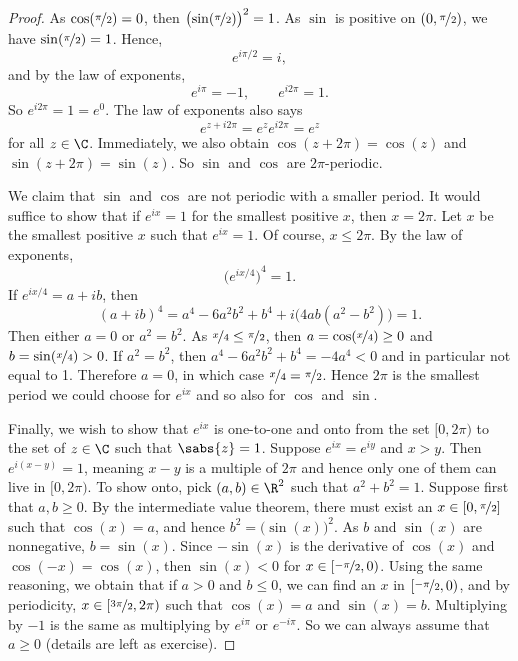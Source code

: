 \begin{proof}
As $\cos(\nicefrac{\pi}{2}) = 0$, then
${\bigl(\sin(\nicefrac{\pi}{2})\bigr)}^2 = 1$.
As $\sin$ is positive on $(0,\nicefrac{\pi}{2})$, we have
$\sin(\nicefrac{\pi}{2}) = 1$.
Hence,
\begin{equation*}
e^{i \pi /2} = i ,
\end{equation*}
and by the law of exponents,
\begin{equation*}
e^{i \pi} = -1 ,
\qquad 
e^{i 2\pi} = 1 .
\end{equation*}
So $e^{i2\pi} = 1 = e^0$.  The law of exponents also says
\begin{equation*}
e^{z+i2\pi} = e^z e^{i2\pi} = e^z
\end{equation*}
for all $z \in \C$.  Immediately, we also obtain
$\cos(z+2\pi) = \cos(z)$ and $\sin(z+2\pi) = \sin(z)$.
So $\sin$ and $\cos$ are $2\pi$-periodic.

We claim that $\sin$ and $\cos$ are not periodic with a smaller period.  It
would suffice to show that if $e^{ix} = 1$ for the
smallest positive $x$, then
$x = 2\pi$.  Let $x$ be the smallest positive $x$ such that
$e^{ix} = 1$.
Of course, $x \leq 2\pi$.
By the law of exponents,
\begin{equation*}
{\bigl(e^{ix/4}\bigr)}^4 = 1 .
\end{equation*}
If $e^{ix/4} = a+ib$, then
\begin{equation*}
{(a+ib)}^4
=a^4-6a^2b^2+b^4 + i\bigl(4ab(a^2-b^2)\bigr)
=1 .
\end{equation*}
Then either $a = 0$ or $a^2 = b^2$.
As $\nicefrac{x}{4} \leq \nicefrac{\pi}{2}$, then $a = \cos(\nicefrac{x}{4}) \geq 0$ and
$b = \sin(\nicefrac{x}{4}) > 0$.
If $a^2=b^2$, then
$a^4-6a^2b^2+b^4 = -4a^4 < 0$ and in particular not equal to 1.
Therefore $a=0$, in which case $\nicefrac{x}{4} = \nicefrac{\pi}{2}$.
Hence $2\pi$ is the smallest period we could choose for $e^{ix}$
and so also for $\cos$ and $\sin$.

Finally, we wish to show that $e^{ix}$ is one-to-one and onto
from the set $[0,2\pi)$ to the set of $z \in \C$ such that
$\sabs{z} = 1$.  Suppose $e^{ix} = e^{iy}$ and 
$x > y$.  Then
$e^{i(x-y)} = 1$, meaning $x-y$ is a multiple of $2\pi$ and hence
only one of them can live in $[0,2\pi)$.
To show onto, pick $(a,b) \in \R^2$ such that $a^2+b^2 = 1$.
Suppose first that $a,b \geq 0$.  By the intermediate value theorem,
there must exist an $x \in [0,\nicefrac{\pi}{2}]$ such that
$\cos(x) = a$, and hence $b^2 = \bigl(\sin(x)\bigr)^2$.  As
$b$ and $\sin(x)$ are nonnegative, $b = \sin(x)$.
Since $-\sin(x)$ is the derivative of $\cos(x)$
and $\cos(-x) = \cos(x)$, then $\sin(x) < 0$ for $x \in [\nicefrac{-\pi}{2},0)$.
Using the same reasoning, we obtain that
if $a > 0$ and $b \leq 0$, we can find an $x$ in $[\nicefrac{-\pi}{2},0)$,
and by periodicity,
$x \in [\nicefrac{3\pi}{2},2\pi)$ such that $\cos(x) = a$ and $\sin(x)=b$.
Multiplying by $-1$ is the same as multiplying by $e^{i\pi}$ or
$e^{-i\pi}$.  So we can always assume that $a \geq 0$ (details are left
as exercise).
\end{proof}

